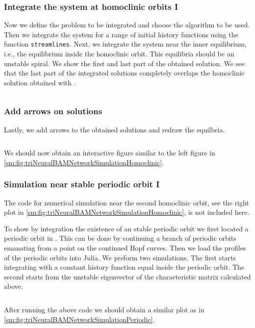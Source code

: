 \subsubsection{Integrate the system at homoclinic orbits I}
Now we define the problem to be integrated and choose the algorithm to be used.
Then we integrate the system for a range of initial history functions using the
function \texttt{streamlines}. Next, we integrate the system near
the inner equilibrium, i.e., the equilibrium inside the homoclinic orbit. This
equilibria should be an unstable spiral. We show the first and last part
of the obtained solution. We see that the last part of the integrated solutions
completely overlaps the homoclinic solution obtained with \DDEBIFTOOL.
\inputminted[firstline=142, lastline=165]{julia}{\pathToJuliaFiles/triNeuralBAMNetworkModel_simulation_article.jl}

\subsubsection{Add arrows on solutions}
Lastly, we add arrows to the obtained solutions and redraw the equilbria.
\inputminted[firstline=167, lastline=178]{julia}{\pathToJuliaFiles/triNeuralBAMNetworkModel_simulation_article.jl}
We should now obtain an interactive figure similar to the left figure in
\cref{sm:fig:triNeuralBAMNetworkSimulationHomoclinic}.

\subsubsection{Simulation near stable periodic orbit I}
The code for numerical simulation near the second homoclinic orbit, see the
right plot in \cref{sm:fig:triNeuralBAMNetworkSimulationHomoclinic}, is not
included here.

To show by integration the existence of an stable periodic orbit we first
located a periodic orbit in \DDEBIFTOOL. This can be done by continuing a
branch of periodic orbits emanating from a point on the continued Hopf curves.
Then we load the profiles of the periodic orbits into Julia. We preform
two simulations. The first starts integrating with a constant history function
equal inside the periodic orbit. The second starts from the unstable eigenvector
of the characteristic matrix calculated above.
\inputminted[firstline=237, lastline=328]{julia}{\pathToJuliaFiles/triNeuralBAMNetworkModel_simulation_article.jl}
After running the above code we should obtain a similar plot as in
\cref{sm:fig:triNeuralBAMNetworkSimulationPeriodic}.

